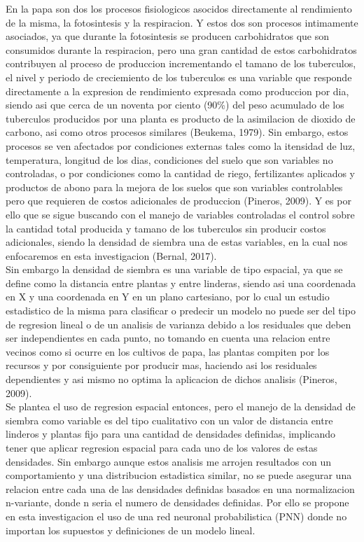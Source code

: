 En la papa son dos los procesos fisiologicos asocidos directamente al rendimiento de la misma, la fotosintesis y la respiracion. Y estos dos son procesos intimamente asociados, ya que durante la fotosintesis se producen carbohidratos que son consumidos durante la respiracion, pero una gran cantidad de estos carbohidratos contribuyen al proceso de produccion incrementando el tamano de los tuberculos, el nivel y periodo de creciemiento de los tuberculos es una variable que responde directamente a la expresion de rendimiento expresada como produccion por dia, siendo asi que cerca de un noventa por ciento (90\%) del peso acumulado de los tuberculos producidos por una planta es producto de la asimilacion de dioxido de carbono, asi como otros procesos similares (Beukema, 1979). Sin embargo, estos procesos se ven afectados por condiciones externas tales como la itensidad de luz, temperatura, longitud de los dias, condiciones del suelo que son variables no controladas, o por condiciones como la cantidad de riego, fertilizantes aplicados y productos de abono para la mejora de los suelos que son variables controlables pero que requieren de costos adicionales de produccion (Pineros, 2009). Y es por ello que se sigue buscando con el manejo de variables controladas el control sobre la cantidad total producida y tamano de los tuberculos sin producir costos adicionales, siendo la densidad de siembra una de estas variables, en la cual nos enfocaremos en esta investigacion (Bernal, 2017).\\

Sin embargo la densidad de siembra es una variable de tipo espacial, ya que se define como la distancia entre plantas y entre linderas, siendo asi una coordenada en X y una coordenada en Y en un plano cartesiano, por lo cual un estudio estadistico de la misma para clasificar o predecir un modelo no puede ser del tipo de regresion lineal o de un analisis de varianza debido a los residuales que deben ser independientes en cada punto, no tomando en cuenta una relacion entre vecinos como si ocurre en los cultivos de papa, las plantas compiten por los recursos y por consiguiente por producir mas, haciendo asi los residuales dependientes y asi mismo no optima la aplicacion de dichos analisis (Pineros, 2009). \\

Se plantea el uso de regresion espacial entonces, pero el manejo de la densidad de siembra como variable es del tipo cualitativo con un valor de distancia entre linderos y plantas fijo para una cantidad de densidades definidas, implicando tener que aplicar regresion espacial para cada uno de los valores de estas densidades. Sin embargo aunque estos analisis me arrojen resultados con un comportamiento y una distribucion estadistica similar, no se puede asegurar una relacion entre cada una de las densidades definidas basados en una normalizacion n-variante, donde n seria el numero de densidades definidas. Por ello se propone en esta investigacion el uso de una red neuronal probabilistica (PNN) donde no importan los supuestos y definiciones de un modelo lineal.\\

